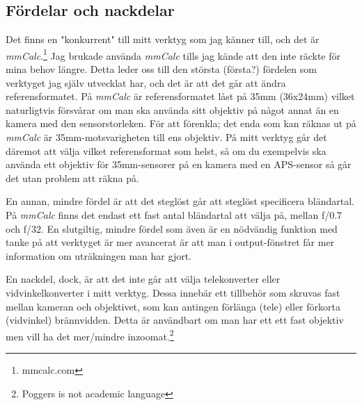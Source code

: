 \documentclass[11pt]{article}
\begin{document}
\subsection{Fördelar och nackdelar}
Det finns en "konkurrent" till mitt verktyg som jag känner till, och det är
\emph{mmCalc}.\footnote{mmcalc.com} Jag brukade använda \emph{mmCalc} tills
jag kände att den inte räckte för mina behov längre. Detta leder oss till den
största {(första?)} fördelen som verktyget jag själv utvecklat har, och det
är att det går att ändra referensformatet. På \emph{mmCalc} är
referensformatet låst på 35mm (36x24mm) vilket naturligtvis försvårar om man
ska använda sitt objektiv på något annat än en kamera med den sensorstorleken.
För att förenkla; det enda som kan räknas ut på \emph{mmCalc} är
35mm-motsvarigheten till ens objektiv. På mitt verktyg går det däremot att välja
vilket referensformat som helst, så om du exempelvis ska använda ett objektiv
för 35mm-sensorer på en kamera med en APS-sensor så går det utan problem att
räkna på. \par
En annan, mindre fördel är att det steglöst går att steglöst
specificera bländartal. På \emph{mmCalc} finns det endast ett fast antal
bländartal att välja på, mellan f/0.7 och f/32. En slutgiltig, mindre fördel
som även är en nödvändig funktion med tanke på att verktyget är mer avancerat
är att man i output-fönstret får mer information om uträkningen man har gjort.
\par

En nackdel, dock, är att det inte går att välja telekonverter eller 
vidvinkelkonverter i mitt verktyg. Dessa innebär ett tillbehör som skruvas
fast mellan kameran och objektivet, som kan antingen förlänga (tele) eller
förkorta (vidvinkel) brännvidden. Detta är användbart om man har ett ett fast
objektiv men vill ha det mer/mindre inzoomat.\footnote{Poggers is not academic
language}\par
\end{document}
